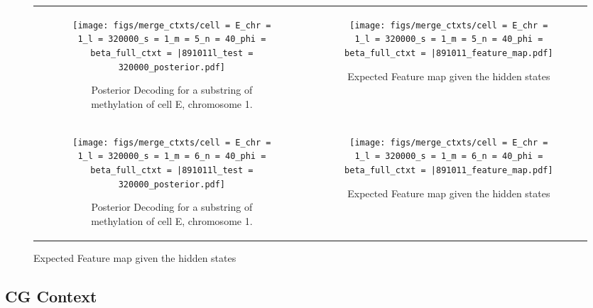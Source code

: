 \documentclass{article}
\begin{document}
    \begin{figure}[H]
        \begin{tabular}{cc}
          \begin{subfigure}[t]{0.4\textwidth}
            \texttt{[image: figs/merge\_ctxts/cell = E\_chr = 1\_l = 320000\_s = 1\_m = 5\_n = 40\_phi = beta\_full\_ctxt = |891011l\_test = 320000\_posterior.pdf]}
            \caption{Posterior Decoding for a substring of methylation of cell E, chromosome 1.}
          \end{subfigure}
          &
          \begin{subfigure}[t]{0.4\textwidth}
            \texttt{[image: figs/merge\_ctxts/cell = E\_chr = 1\_l = 320000\_s = 1\_m = 5\_n = 40\_phi = beta\_full\_ctxt = |891011\_feature\_map.pdf]}
            \caption{Expected Feature map given the hidden states}
          \end{subfigure}
      \\
      \begin{subfigure}[t]{0.4\textwidth}
        \texttt{[image: figs/merge\_ctxts/cell = E\_chr = 1\_l = 320000\_s = 1\_m = 6\_n = 40\_phi = beta\_full\_ctxt = |891011l\_test = 320000\_posterior.pdf]}
        \caption{Posterior Decoding for a substring of methylation of cell E, chromosome 1.}
      \end{subfigure}
      &
      \begin{subfigure}[t]{0.4\textwidth}
        \texttt{[image: figs/merge\_ctxts/cell = E\_chr = 1\_l = 320000\_s = 1\_m = 6\_n = 40\_phi = beta\_full\_ctxt = |891011\_feature\_map.pdf]}
        \caption{Expected Feature map given the hidden states}
      \end{subfigure}
    \end{tabular}
\end{figure}

\subsection{CG Context}
\end{document}
